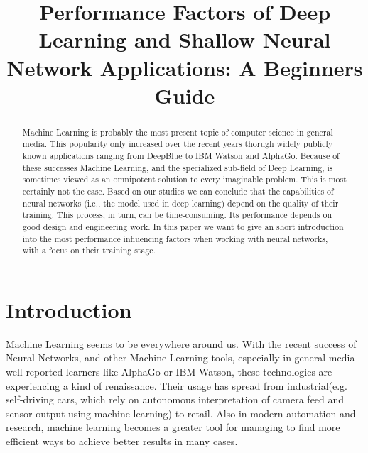 \documentclass[conference]{IEEEtran}
\begin{document}
\title{
Performance Factors of Deep Learning and Shallow Neural Network Applications: A Beginners Guide
}

\author{
}

\maketitle

\begin{abstract}

Machine Learning is probably the most present topic of computer science in general media. This popularity only increased over the recent years thorugh widely publicly known applications ranging from DeepBlue to IBM Watson and AlphaGo. Because of these successes Machine Learning, and the specialized sub-field of Deep Learning,  is sometimes viewed as an omnipotent solution to every imaginable problem. This is most certainly not the case. Based on our studies we can conclude that the capabilities of neural networks (i.e., the model used in deep learning) depend on the quality of their training. This process, in turn, can be time-consuming. Its performance depends on good design and engineering work. In this paper we want to give an short introduction into the most performance influencing factors when working with neural networks, with a focus on their training stage.
\end{abstract}

\IEEEpeerreviewmaketitle
\section{Introduction}
Machine Learning seems to be everywhere around us. With the recent success of Neural Networks, and other Machine Learning tools, especially  in general media well reported learners like AlphaGo or IBM Watson, these technologies are experiencing a kind of renaissance. Their usage has spread from industrial(e.g. self-driving cars, which rely on autonomous interpretation of camera feed and sensor output using machine learning) to retail. Also in modern automation and research, machine learning becomes a greater tool for managing to find more efficient ways to achieve better results in many cases.
\end{document}
